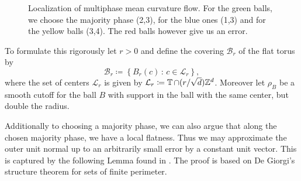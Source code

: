 \begin{figure}[h]
	\centering
	\caption{Localization of multiphase mean curvature flow. For the green 
	balls, we choose the majority phase (2,3), for the blue ones (1,3) and for 
	the yellow balls (3,4). The red balls however give us an error.}
	
	\label{figure_localization_of_mmcf}
\end{figure}

To formulate this rigorously let $ r > 0 $ and define the covering $ \mathcal{ 
B }_{ r 
} $ of the flat torus by
\begin{equation*}
	\mathcal{B}_{ r } \coloneqq
	\left\{
	B_{ r } ( c ) 
	\, \colon \,
	c \in \mathcal{ L }_{ r }
	\right\},
\end{equation*}
where the set of centers $ \mathcal{ L }_{ r } $ is given by $ \mathcal{ L }_{ 
	r } \coloneqq \operatorname{\mathbb{T}} \cap (r/\sqrt{ d }) \mathbb{ Z }^{ d } $. Moreover 
	let 
$ \rho_{ B } $ be a smooth cutoff for the ball $ B $ with support in the ball 
with the same center, but double the radius.

Additionally to choosing a majority phase, we can also argue that along the 
chosen majority phase, we have a local flatness. Thus we may approximate the 
outer unit normal up to an arbitrarily small error by a constant unit vector. 
This is captured by the following Lemma found in 
\cite{laux_otto_convergence_of_thresholding_scheme_for_mmcf}. The proof is 
based on De Giorgi's structure theorem for sets of finite perimeter.

